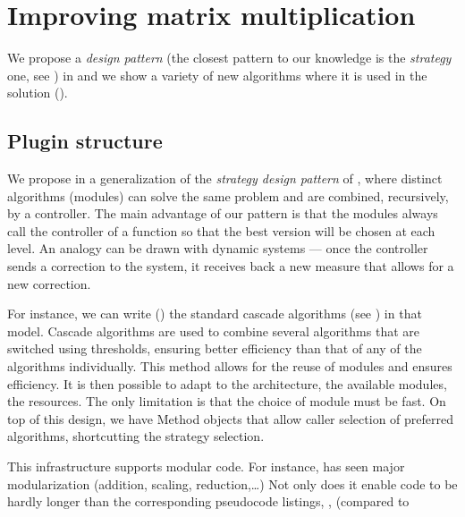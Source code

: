 \section{Improving \linbox matrix multiplication}\label{sec:matmul}
%
We propose a \emph{design pattern} (the closest pattern to our knowledge is the
\emph{strategy} one, see \cite[Fig 2.]{Cung:2006:TC}) in  and
we show a variety of new algorithms where it is used in the \mul  solution
().
%
\subsection{Plugin structure}\label{ssec:plugin}
%
We propose in  a generalization of the \emph{strategy
  design pattern} of \cite[Fig 2.]{Cung:2006:TC}, where distinct
algorithms (modules) can solve the
same problem and are combined, recursively, by a controller.
The main advantage of our pattern is that the modules always call
the controller of a function so that the best version will be chosen
at each level.
An analogy can be drawn with dynamic systems --- once the controller sends a
correction to the system, it receives back a new measure that allows for a new
correction.
%
\par

%
%
%
%
For instance, we can write () the standard cascade algorithms
(see \cite{Dumas:2008:Flas}) in that model. Cascade algorithms are used to combine
several algorithms that are switched using thresholds, ensuring better
efficiency than that of any of the algorithms individually.
%
%
%
This method allows for the reuse of modules and ensures efficiency.
It is then possible to adapt to the architecture, the available modules,
the resources. The only limitation is that the choice of module
must be fast.
%
%
On top of this design, we have Method objects that allow caller selection
of preferred algorithms, shortcutting the strategy selection.
%

%
%
\par
%
This infrastructure supports modular code. For instance,
\fflasffpack has seen major  modularization (addition, scaling,
reduction,\ldots) Not only does it enable code to be hardly longer than
the corresponding pseudocode listings, \cite{Boyer:2009:sched}, (compared to
